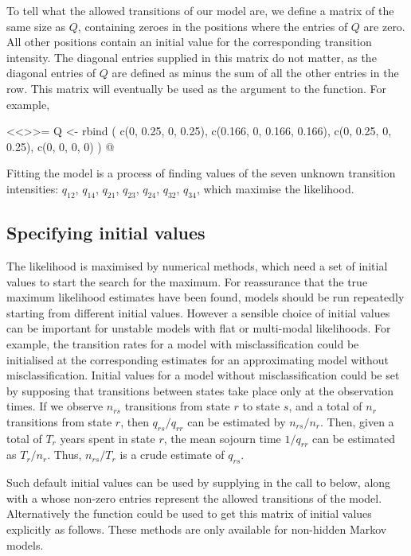 To tell  what the allowed transitions of our model are,
we define a matrix of the same size as $Q$, containing zeroes in the
positions where the entries of $Q$ are zero.  All other positions
contain an initial value for the corresponding transition intensity.
The diagonal entries supplied in this matrix do not matter, as the
diagonal entries of $Q$ are defined as minus the sum of all the other
entries in the row.  This matrix will eventually be used as the
 argument to the  function. For
example,

<<>>=
Q  <-  rbind ( c(0, 0.25, 0, 0.25),
               c(0.166, 0, 0.166, 0.166),
               c(0, 0.25, 0, 0.25),
               c(0, 0, 0, 0) )
@

Fitting the model is a process of finding values of the seven unknown
transition intensities: $q_{12}$, $q_{14}$, $q_{21}$, $q_{23}$,
$q_{24}$, $q_{32}$, $q_{34}$, which maximise the likelihood.

\subsection{Specifying initial values}
\label{sec:inits}

The likelihood is maximised by numerical methods, which need a set of
initial values to start the search for the maximum.  For reassurance
that the true maximum likelihood estimates have been found, models
should be run repeatedly starting from different initial
values. However a sensible choice of initial values can be important
for unstable models with flat or multi-modal likelihoods.  For
example, the transition rates for a model with misclassification could
be initialised at the corresponding estimates for an approximating
model without misclassification. Initial values for a model without
misclassification could be set by supposing that transitions between
states take place only at the observation times.  If we observe
$n_{rs}$ transitions from state $r$ to state $s$, and a total of $n_r$
transitions from state $r$, then $q_{rs} / q_{rr}$ can be estimated by
$n_{rs} / n_r$. Then, given a total of $T_r$ years spent in state $r$,
the mean sojourn time $1 / q_{rr}$ can be estimated as $T_r / n_r$.
Thus, $n_{rs} / T_r$ is a crude estimate of $q_{rs}$.

Such default initial values can be used by supplying
 in the call to  below, along
with a  whose non-zero entries represent the allowed
transitions of the model.  Alternatively the function 
could be used to get this matrix of initial values explicitly as follows.
These methods are only available for non-hidden Markov models.

